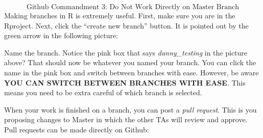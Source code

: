 \documentclass[
]{article}
\begin{document}
\[\text{Github Commandment 3: Do Not Work Directly on Master Branch}\]
Making branches in R is extremely useful. First, make sure you are in
the Rproject. Next, click the ``create new branch'' button. It is
pointed out by the green arrow in the following picture:

\begin{center}
\end{center}

Name the branch. Notice the pink box that says \emph{danny\_testing} in
the picture above? That should now be whatever you named your branch.
You can click the name in the pink box and switch between branches with
ease. However, be aware \textbf{YOU CAN SWITCH BETWEEN BRANCHES WITH
EASE}. This means you need to be extra careful of which branch is
selected.

When your work is finished on a branch, you can post a \emph{pull
request}. This is you proposing changes to Master in which the other TAs
will review and approve. Pull requests can be made directly on Github:

\begin{center}
\end{center}
\end{document}
